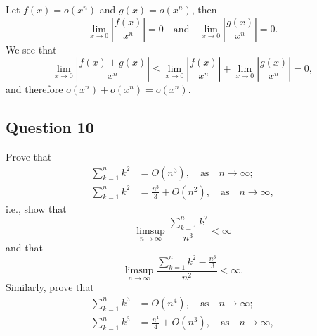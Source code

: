 Let $ f(x) = o(x^n) $ and $ g(x) = o(x^n) $, then
\begin{equation*}
    \lim_{x \rightarrow 0} \left| \frac{f(x)}{x^n} \right| = 0 \quad
        \text{and} \quad \lim_{x \rightarrow 0} \left| \frac{g(x)}{x^n}
        \right| = 0.
\end{equation*}
We see that
\begin{equation*}
    \lim_{x \rightarrow 0} \left| \frac{f(x) + g(x)}{x^n} \right| \leq
        \lim_{x \rightarrow 0} \left| \frac{f(x)}{x^n} \right| +
        \lim_{x \rightarrow 0} \left| \frac{g(x)}{x^n} \right| = 0,
\end{equation*}
and therefore $ o(x^n) + o(x^n) = o(x^n) $.

\subsection{Question 10}
Prove that
\begin{align*}
    \sum_{k=1}^{n} k^2 &= O(n^3), \quad \text{as} \quad n \rightarrow
        \infty; \\
    \sum_{k=1}^{n} k^2 &= \frac{n^3}{3} + O(n^2), \quad \text{as} \quad n
        \rightarrow \infty,
\end{align*}
i.e., show that
\begin{equation*}
    \limsup_{n \rightarrow \infty} \frac{\sum_{k=1}^{n} k^2}{n^3} < \infty
\end{equation*}
and that
\begin{equation*}
    \limsup_{n \rightarrow \infty} \frac{\sum_{k=1}^{n} k^2 -
        \frac{n^3}{3}}{n^2} < \infty.
\end{equation*}
Similarly, prove that
\begin{align*}
    \sum_{k=1}^{n} k^3 &= O(n^4), \quad \text{as} \quad n \rightarrow
        \infty; \\
    \sum_{k=1}^{n} k^3 &= \frac{n^4}{4} + O(n^3), \quad \text{as} \quad n
        \rightarrow \infty,
\end{align*}

